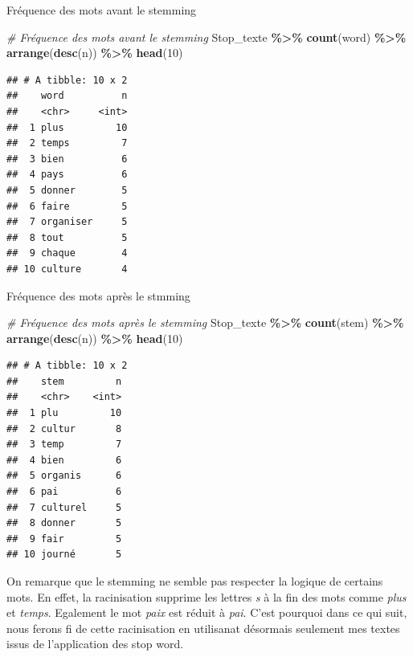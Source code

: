 \documentclass[
]{article}
\newenvironment{Shaded}{\begin{snugshade}}{\end{snugshade}}
\newcommand{\CommentTok}[1]{\textcolor[rgb]{0.56,0.35,0.01}{\textit{#1}}}
\newcommand{\DecValTok}[1]{\textcolor[rgb]{0.00,0.00,0.81}{#1}}
\newcommand{\FunctionTok}[1]{\textcolor[rgb]{0.13,0.29,0.53}{\textbf{#1}}}
\newcommand{\NormalTok}[1]{#1}
\newcommand{\SpecialCharTok}[1]{\textcolor[rgb]{0.81,0.36,0.00}{\textbf{#1}}}
\begin{document}
Fréquence des mots avant le stemming

\begin{Shaded}
\begin{Highlighting}[]
\CommentTok{\# Fréquence des mots avant le stemming}
\NormalTok{Stop\_texte }\SpecialCharTok{\%\textgreater{}\%}
  \FunctionTok{count}\NormalTok{(word) }\SpecialCharTok{\%\textgreater{}\%}
  \FunctionTok{arrange}\NormalTok{(}\FunctionTok{desc}\NormalTok{(n)) }\SpecialCharTok{\%\textgreater{}\%}
  \FunctionTok{head}\NormalTok{(}\DecValTok{10}\NormalTok{)}
\end{Highlighting}
\end{Shaded}

\begin{verbatim}
## # A tibble: 10 x 2
##    word          n
##    <chr>     <int>
##  1 plus         10
##  2 temps         7
##  3 bien          6
##  4 pays          6
##  5 donner        5
##  6 faire         5
##  7 organiser     5
##  8 tout          5
##  9 chaque        4
## 10 culture       4
\end{verbatim}

Fréquence des mots après le stmming

\begin{Shaded}
\begin{Highlighting}[]
\CommentTok{\# Fréquence des mots après le stemming}
\NormalTok{Stop\_texte }\SpecialCharTok{\%\textgreater{}\%}
  \FunctionTok{count}\NormalTok{(stem) }\SpecialCharTok{\%\textgreater{}\%}
  \FunctionTok{arrange}\NormalTok{(}\FunctionTok{desc}\NormalTok{(n)) }\SpecialCharTok{\%\textgreater{}\%}
  \FunctionTok{head}\NormalTok{(}\DecValTok{10}\NormalTok{)}
\end{Highlighting}
\end{Shaded}

\begin{verbatim}
## # A tibble: 10 x 2
##    stem         n
##    <chr>    <int>
##  1 plu         10
##  2 cultur       8
##  3 temp         7
##  4 bien         6
##  5 organis      6
##  6 pai          6
##  7 culturel     5
##  8 donner       5
##  9 fair         5
## 10 journé       5
\end{verbatim}

On remarque que le stemming ne semble pas respecter la logique de
certains mots. En effet, la racinisation supprime les lettres \emph{s} à
la fin des mots comme \emph{plus} et \emph{temps}. Egalement le mot
\emph{paix} est réduit à \emph{pai}. C'est pourquoi dans ce qui suit,
nous ferons fi de cette racinisation en utilisanat désormais seulement
mes textes issus de l'application des stop word.
\end{document}
